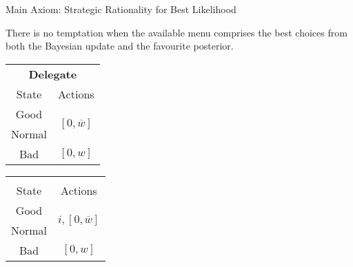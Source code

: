 \documentclass[usenames,dvipsnames,aspectratio=169,11pt, envcountsect, handout]{beamer}
\begin{document}
\begin{frame}{Main Axiom: Strategic Rationality for Best Likelihood}\label{srbl}

	\begin{axiom}\label{ax:srbl}
		There is no temptation when the available menu comprises the best choices from both the Bayesian update and the favourite posterior. \pause
	\end{axiom}

	\vfill

	\begin{table}[H]
		\centering
		\begin{minipage}{0.4\textwidth}
			\centering
			\begin{tabular}{c | c}
				\multicolumn{2}{c}{\textbf{Delegate}}                                                     \\
				State                & Actions                                                            \\
				\hline
				{\color{blue}Good}   & \multirow{2}{*}{{\color{blue}\( \left[0, \overline{w} \right] \)}} \\
				{\color{blue}Normal} &                                                                    \\
				Bad                  & \( \left[0, w \right]\)                                            \\
			\end{tabular}
			\vspace{0.5cm} %
		\end{minipage}%
		\begin{minipage}{0.4\textwidth}
			\centering
			\begin{tabular}{c | c}
				\multicolumn{2}{c}{}                                                                          \\
				State                & Actions                                                                \\
				\hline
				{\color{blue}Good}   & \multirow{2}{*}{{\color{blue}\( i, \left[ 0, \overline{w} \right] \)}} \\
				{\color{blue}Normal} &                                                                        \\
				Bad                  & \( \left[0, w \right] \)                                               \\
			\end{tabular}
			\vspace{0.5cm} %
		\end{minipage} %
	\end{table}


\end{frame}
\end{document}
